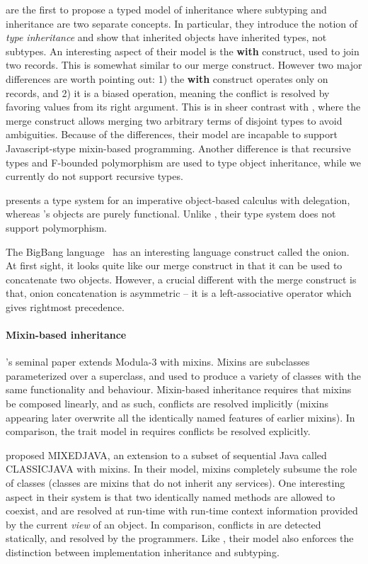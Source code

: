 \citet{cook1989inheritance} are the first to propose a typed model of
inheritance where subtyping and inheritance are two separate concepts. In
particular, they introduce the notion of \textit{type inheritance} and show that
inherited objects have inherited types, not subtypes. An interesting aspect of
their model is the \textbf{with} construct, used to join two records. This is
somewhat similar to our merge construct. However two major differences are worth
pointing out: 1) the \textbf{with} construct operates only on records, and 2) it
is a biased operation, meaning the conflict is resolved by favoring values from
its right argument. This is in sheer contrast with \name, where the merge
construct allows merging two arbitrary terms of disjoint types to avoid
ambiguities. Because of the differences, their model are incapable to support
Javascript-stype mixin-based programming. Another difference is that recursive
types and F-bounded polymorphism are used to type object inheritance, while we
currently do not support recursive types.

\citet{anderson2003can} presents a type system for an imperative object-based
calculus with delegation, whereas \name's objects are purely functional. Unlike
\name, their type system does not support polymorphism.

The BigBang language~\cite{palmer2015building,menon2012big} has an interesting
language construct called the onion. At first sight, it looks quite like our
merge construct in that it can be used to concatenate two objects. However, a
crucial different with the merge construct is that, onion concatenation is
asymmetric -- it is a left-associative operator which gives rightmost
precedence.


\paragraph{Mixin-based inheritance} \citet{bracha1990mixin}'s seminal paper
extends Modula-3 with mixins. Mixins are subclasses parameterized over a
superclass, and used to produce a variety of classes with the same functionality
and behaviour. Mixin-based inheritance requires that mixins be composed
linearly, and as such, conflicts are resolved implicitly (mixins appearing later
overwrite all the identically named features of earlier mixins). In comparison,
the trait model in \name requires conflicts be resolved explicitly.

\citet{flatt1998classes} proposed MIXEDJAVA, an extension to a subset of
sequential Java called CLASSICJAVA with mixins. In their model, mixins
completely subsume the role of classes (classes are mixins that do not inherit
any services). One interesting aspect in their system is that two identically
named methods are allowed to coexist, and are resolved at run-time with run-time
context information provided by the current \textit{view} of an object. In
comparison, conflicts in \name are detected statically, and resolved by the
programmers. Like \name, their model also enforces the distinction between
implementation inheritance and subtyping.

